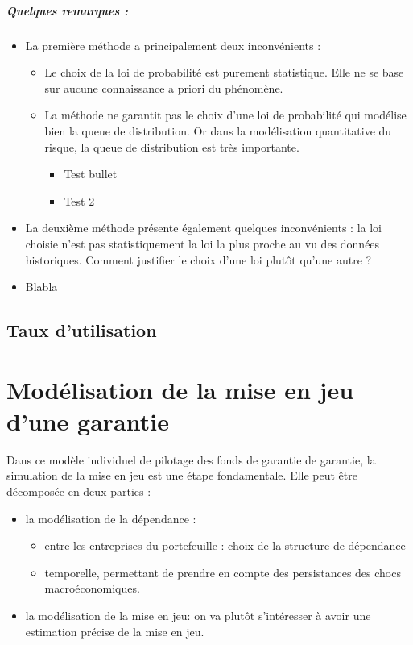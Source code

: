 \documentclass[12pt,a4paper]{report}
\begin{document}
\paragraph{Quelques remarques :}
\begin{itemize}
    \item La première méthode a principalement deux inconvénients :
    \begin{itemize}
        \item Le choix de la loi de probabilité est purement statistique. Elle ne se base sur aucune connaissance a priori du phénomène.
        \item La méthode ne garantit pas le choix d’une loi de probabilité qui modélise bien la queue de distribution. Or dans la modélisation quantitative du risque, la queue de distribution est très importante.
        \begin{itemize}
            \item Test bullet
            \item Test 2
        \end{itemize}
    \end{itemize}
    \item La deuxième méthode présente également quelques inconvénients : la loi choisie n’est pas statistiquement la loi la plus proche au vu des données historiques. Comment justifier le choix d’une loi plutôt qu’une autre ?
    \item Blabla
\end{itemize}

\section{Taux d'utilisation}

\newpage

\chapter{Modélisation de la mise en jeu d'une garantie}
Dans ce modèle individuel de pilotage des fonds de garantie de garantie, la simulation de la mise en jeu est une étape fondamentale. Elle peut être décomposée en deux parties :
\begin{itemize}
    \item la modélisation de la dépendance :
    \begin{itemize}
        \item entre les entreprises du portefeuille : choix de la structure de dépendance
        \item temporelle, permettant de prendre en compte des persistances des chocs macroéconomiques.
    \end{itemize}
    \item la modélisation de la mise en jeu: on va plutôt s’intéresser à avoir une estimation précise de la mise en jeu.
\end{itemize}
\end{document}
